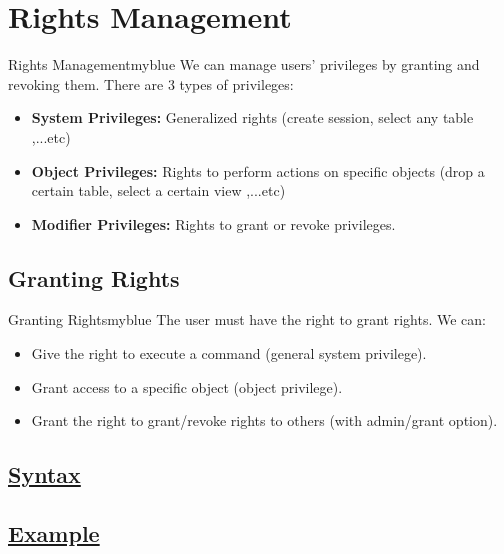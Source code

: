 \section{Rights Management} 
\begin{prettyBox}{Rights Management}{myblue}
We can manage users' privileges by granting and revoking them. 
There are 3 types of privileges:

\begin{itemize} 
\item \textbf{System Privileges:} Generalized rights (create session, select any table ,...etc) 
\item \textbf{Object Privileges:} Rights to perform actions on specific objects (drop a certain table, select a certain view ,...etc) 
\item \textbf{Modifier Privileges:} Rights to grant or revoke privileges. 
\end{itemize} 

\end{prettyBox}

\subsection{Granting Rights} 
\begin{prettyBox}{Granting Rights}{myblue} 
The user must have the right to grant rights. We can: 
\begin{itemize} 
\item Give the right to execute a command (general system privilege). 
\item Grant access to a specific object (object privilege). 
\item Grant the right to grant/revoke rights to others (with admin/grant option).
\end{itemize} 
\end{prettyBox}

\vspace{0.15cm}
\subsection*{\underline{Syntax}} 


\vspace{0.15cm}
\subsection*{\underline{Example}} 



